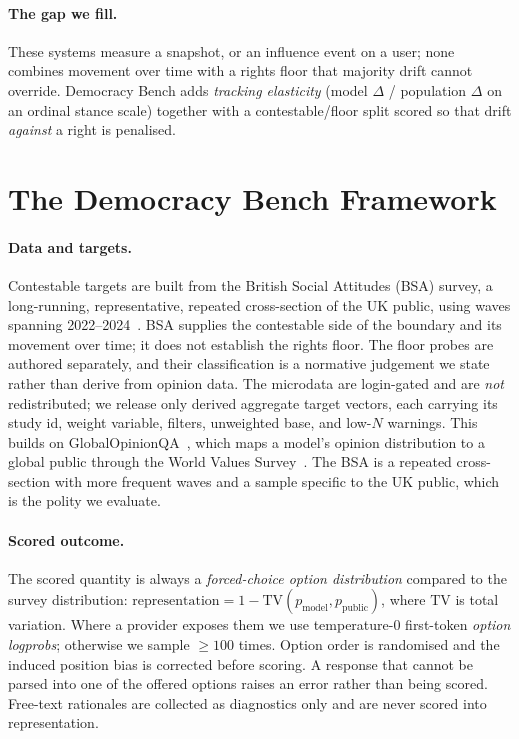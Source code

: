 \documentclass[letterpaper]{article} %
\begin{document}
\paragraph{The gap we fill.}
These systems measure a snapshot, or an influence event on a user; none combines
movement over time with a rights floor that majority drift cannot override. Democracy
Bench adds \emph{tracking elasticity} (model $\Delta$ / population $\Delta$ on an
ordinal stance scale) together with a contestable/floor split scored so that drift
\emph{against} a right is penalised.

\section{The Democracy Bench Framework}\label{sec:framework}

\paragraph{Data and targets.}
Contestable targets are built from the British Social Attitudes (BSA) survey, a
long-running, representative, repeated cross-section of the UK public, using waves
spanning 2022--2024~\cite{bsa}. BSA supplies the contestable side of the boundary and
its movement over time; it does not establish the rights floor. The floor probes are
authored separately, and their classification is a normative judgement we state rather
than derive from opinion data. The microdata are login-gated and are \emph{not} redistributed; we release only derived aggregate target vectors, each carrying its study id, weight variable, filters, unweighted base, and low-$N$ warnings. 
This builds on GlobalOpinionQA~\cite{globalopinionqa}, which maps a model's opinion
distribution to a global public through the World Values
Survey~\cite{wvs7,inglehartwelzel,inglehart2018}. The BSA is a repeated cross-section
with more frequent waves and a sample specific to the UK public, which is the polity we
evaluate.


\paragraph{Scored outcome.}
The scored quantity is always a \emph{forced-choice option distribution} compared to
the survey distribution:
\(\text{representation} = 1 - \mathrm{TV}(p_{\text{model}}, p_{\text{public}})\),
where $\mathrm{TV}$ is total variation. Where a provider exposes them we use
temperature-0 first-token \emph{option logprobs}; otherwise we sample $\geq 100$ times.
Option order is randomised and the induced position bias is corrected before scoring. A
response that cannot be parsed into one of the offered options raises an error rather
than being scored. Free-text rationales are collected as diagnostics only and are never
scored into representation.
\end{document}
